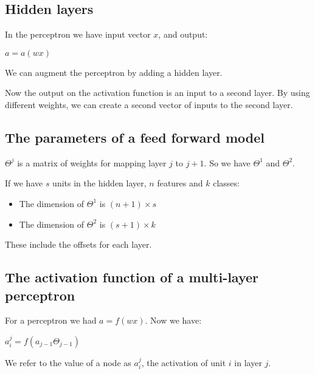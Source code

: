 
\subsection{Hidden layers}

In the perceptron we have input vector \(x\), and output:

\(a=a(wx)\)

We can augment the perceptron by adding a hidden layer.

Now the output on the activation function is an input to a second layer. By using different weights, we can create a second vector of inputs to the second layer.

\subsection{The parameters of a feed forward model}

\(\Theta^{j}\) is a matrix of weights for mapping layer \(j\) to \(j+1\). So we have \(\Theta^1\) and \(\Theta^2\).

If we have \(s\) units in the hidden layer, \(n\) features and \(k\) classes:

\begin{itemize}
\item The dimension of \(\Theta^1\) is \((n+1) \times s\)
\item The dimension of \(\Theta^2\) is \((s+1) \times k\)
\end{itemize}

These include the offsets for each layer.

\subsection{The activation function of a multi-layer perceptron}

For a perceptron we had \(a=f(wx)\). Now we have:

\(a_i^j=f(a_{j-1}\Theta_{j-1})\)

We refer to the value of a node as \(a_i^{j}\), the activation of unit \(i\) in layer \(j\).

